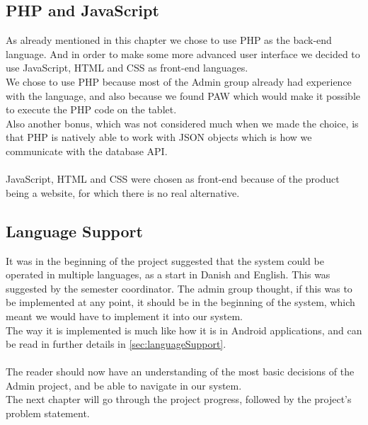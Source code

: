 \subsection{PHP and JavaScript}
As already mentioned in this chapter we chose to use PHP as the back-end language. And in order to make some more advanced user interface we decided to use JavaScript, HTML and CSS as front-end languages.\\
We chose to use PHP because most of the Admin group already had experience with the language, and also because we found PAW which would make it possible to execute the PHP code on the tablet.\\
Also another bonus, which was not considered much when we made the choice, is that PHP is natively able to work with JSON objects which is how we communicate with the database API.\\
\\
JavaScript, HTML and CSS were chosen as front-end because of the product being a website, for which there is no real alternative.

\subsection{Language Support}
It was in the beginning of the project suggested that the system could be operated in multiple languages, as a start in Danish and English. This was suggested by the semester coordinator. The admin group thought, if this was to be implemented at any point, it should be in the beginning of the system, which meant we would have to implement it into our system.\\
The way it is implemented is much like how it is in Android applications, and can be read in further details in \vref{sec:languageSupport}.\\
\\
The reader should now have an understanding of the most basic decisions of the Admin project, and be able to navigate in our system.\\
The next chapter will go through the project progress, followed by the project's problem statement.

